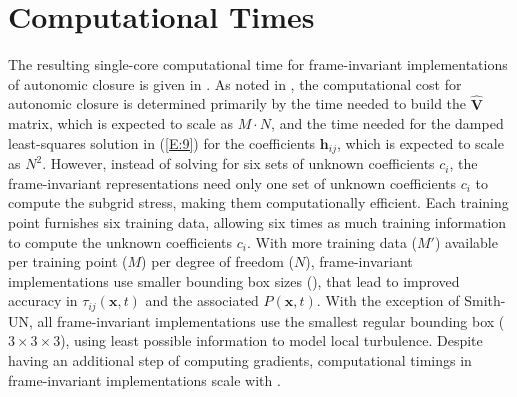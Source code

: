 \section{Computational Times} 
\label{sec:10A}

%
% 
The resulting single-core computational time for frame-invariant implementations of autonomic closure is given in . 
%
%
As noted in , 
	the computational cost for autonomic closure is determined primarily by the time needed to build the $\widehat{\mathbf{V}}$  matrix, 
		which is expected to scale as $M \cdot N$, 
	and the time needed for the damped least-squares solution in (\ref{E:9}) for the coefficients $\mathbf{h}_{ij}$, which is expected to scale as $N^2$. 
% 
However, instead of solving for six sets of unknown coefficients $c_i$, 
the frame-invariant representations 
need only one set of unknown coefficients $c_i$ 
to compute the subgrid stress, making them computationally efficient. 
%
%
Each training point furnishes six training data,
allowing six times as much training information 
to compute the unknown coefficients $c_i$. 
%
%
With more training data ($M'$) available per training point ($M$) per degree of freedom ($N$), frame-invariant implementations use smaller bounding box sizes (), 
that lead to improved accuracy in $\tau_{ij}(\mathbf{x},t)$  
and the associated  $P(\mathbf{x},t)$.
%
%
With the exception of Smith-UN, all frame-invariant implementations use the smallest regular bounding box ($3\times3\times3$), using least possible information to model local turbulence. 
%
%
Despite having an additional step of computing gradients, 
computational timings in frame-invariant implementations scale with .



% 

% 
% 
%
%


